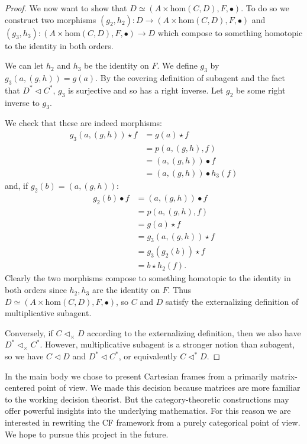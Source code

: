 \documentclass{article}
\begin{document}
\begin{proof}
We now want to show that $D \simeq (A \times \text{hom}(C, D), F, \bullet)$.
To do so we construct two morphisms $(g_2, h_2) : D \to (A \times \text{hom}(C, D), F, \bullet)$ and $(g_3, h_3) : (A \times \text{hom}(C, D), F, \bullet) \to D$ which compose to something homotopic to the identity in both orders.

We can let $h_2$ and $h_3$ be the identity on $F$.
We define $g_3$ by $g_3(a, (g, h)) = g(a)$.
By the covering definition of subagent and the fact that $D^* \triangleleft C^*$, $g_3$ is surjective and so has a right inverse.
Let $g_2$ be some right inverse to $g_3$.

We check that these are indeed morphisms:
\[
\begin{split}
    g_3(a, (g, h)) \star f & = g(a) \star f \\
                           & = p(a, (g, h), f) \\
                           & = (a, (g, h)) \bullet f \\
                           & = (a, (g, h)) \bullet h_3(f)
\end{split}
\]
and, if $g_2(b) = (a, (g, h))$:
\[
\begin{split}
    g_2(b) \bullet f & = (a, (g, h)) \bullet f \\
                     & = p(a, (g, h), f) \\
                     & = g(a) \star f \\
                     & = g_3(a, (g, h)) \star f \\
                     & = g_3(g_2(b)) \star f \\
                     & = b \star h_2(f).
\end{split}
\]
Clearly the two morphisms compose to something homotopic to the identity in both orders since $h_2, h_3$ are the identity on $F$.
Thus $D \simeq (A \times \text{hom}(C, D), F, \bullet)$, so $C$ and $D$ satisfy the externalizing definition of multiplicative subagent.

Conversely, if $C \triangleleft_{\times} D$ according to the externalizing definition, then we also have $D^* \triangleleft_{\times} C^*$.
However, multiplicative subagent is a stronger notion than subagent, so we have $C \triangleleft D$ and $D^* \triangleleft C^*$, or equivalently $C \triangleleft^* D$.
\end{proof}

\noindent In the main body we chose to present Cartesian frames from a primarily matrix-centered point of view.
We made this decision because matrices are more familiar to the working decision theorist.
But the category-theoretic constructions may offer powerful insights into the underlying mathematics.
For this reason we are interested in rewriting the CF framework from a purely categorical point of view.
We hope to pursue this project in the future.


\printbibliography
\end{document}

